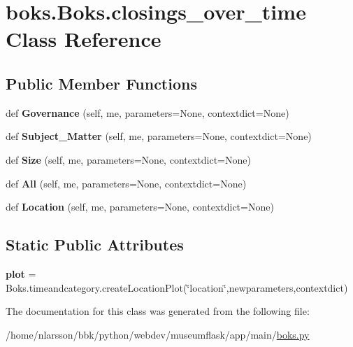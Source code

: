\hypertarget{classboks_1_1Boks_1_1closings__over__time}{}\section{boks.\+Boks.\+closings\+\_\+over\+\_\+time Class Reference}
\label{classboks_1_1Boks_1_1closings__over__time}
\subsection*{Public Member Functions}
\begin{DoxyCompactItemize}
\item 
\mbox{\label{classboks_1_1Boks_1_1closings__over__time_a1db8a5d302549177c871dc42795008ee}} 
def {\bfseries Governance} (self, me, parameters=None, contextdict=None)
\item 
\mbox{\label{classboks_1_1Boks_1_1closings__over__time_a90d1ddc8b7fd088013bf8389401175eb}} 
def {\bfseries Subject\+\_\+\+Matter} (self, me, parameters=None, contextdict=None)
\item 
\mbox{\label{classboks_1_1Boks_1_1closings__over__time_ace3e5b062cef72d794d6523bb5ee3bd7}} 
def {\bfseries Size} (self, me, parameters=None, contextdict=None)
\item 
\mbox{\label{classboks_1_1Boks_1_1closings__over__time_ad5b25c708b6b6e910b0834d9c52a4d0a}} 
def {\bfseries All} (self, me, parameters=None, contextdict=None)
\item 
\mbox{\label{classboks_1_1Boks_1_1closings__over__time_a97a349faef1ea8f302e01fb95282f805}} 
def {\bfseries Location} (self, me, parameters=None, contextdict=None)
\end{DoxyCompactItemize}
\subsection*{Static Public Attributes}
\begin{DoxyCompactItemize}
\item 
\mbox{\label{classboks_1_1Boks_1_1closings__over__time_a02af60230d3e05df9bfc053e3c705d72}} 
{\bfseries plot} = Boks.\+timeandcategory.\+create\+Location\+Plot(\char`\"{}location\char`\"{},newparameters,contextdict)
\end{DoxyCompactItemize}


The documentation for this class was generated from the following file\+:\begin{DoxyCompactItemize}
\item 
/home/nlarsson/bbk/python/webdev/museumflask/app/main/\mbox{\hyperlink{boks_8py}{boks.\+py}}\end{DoxyCompactItemize}
